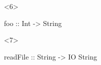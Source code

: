 \documentclass[17pt]{beamer}
\renewcommand{\(}[1]{\begin{columns}[#1]}
\renewcommand{\)}{\end{columns}}
\newcommand{\<}[1]{\begin{column}{#1}}
\renewcommand{\>}{\end{column}}
\begin{document}
\begin{frame}[fragile]
\begin{minipage}[c][.5\textheight]{\textwidth}
\begin{center}
\begin{onlyenv}
\begin{code}
      \end{code}
    \end{onlyenv}
    \begin{onlyenv}<6>
      \begin{code}
                  foo :: Int -> String
      \end{code}
    \end{onlyenv}
    \begin{onlyenv}<7>
      \begin{code}
            readFile :: String -> IO String
      \end{code}
    \end{onlyenv}
  \end{center}
  \end{minipage}
\end{frame}
\end{document}
